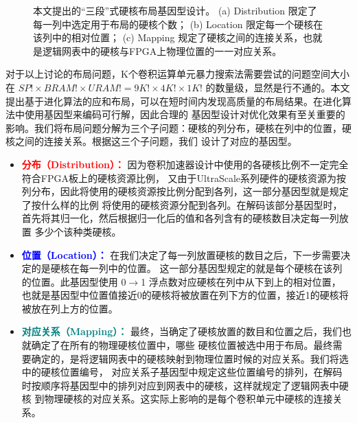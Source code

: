 \begin{figure}[h]

	\caption{
		本文提出的“三段”式硬核布局基因型设计。
		(a) Distribution 限定了每一列中选定用于布局的硬核个数；
		(b) Location 限定每一个硬核在该列中的相对位置；
		(c) Mapping 规定了硬核之间的连接关系，也就是逻辑网表中的硬核与FPGA上物理位置的一一对应关系。
	}
	
	

	\label{fig:genotype}
  \vspace{-0.2in}
\end{figure}

对于以上讨论的布局问题，K个卷积运算单元暴力搜索法需要尝试的问题空间大小在 $SP! \times BRAM! \times URAM! = 9K!\times4K!\times1K!$
的数量级，显然是行不通的。本文提出基于进化算法的应和布局，可以在短时间内发现高质量的布局结果。在进化算法中使用基因型来编码可行解，因此合理的
基因型设计对优化效果有至关重要的影响。我们将布局问题分解为三个子问题：硬核的列分布，硬核在列中的位置，硬核之间的连接关系。根据这三个子问题，我们
设计了对应的基因型。

\begin{itemize}
	\item \textcolor{red}{\bf 分布（Distribution）：} 因为卷积加速器设计中使用的各硬核比例不一定完全符合FPGA板上的硬核资源比例，
		又由于UltraScale系列硬件的硬核资源为按列分布，因此将使用的硬核资源按比例分配到各列，这一部分基因型就是规定了按什么样的比例
		将使用的硬核资源分配到各列。在解码该部分基因型时，首先将其归一化，然后根据归一化后的值和各列含有的硬核数目决定每一列放置
		多少个该种类硬核。
	\item \textcolor{blue}{\bf 位置（Location）：} 在我们决定了每一列放置硬核的数目之后，下一步需要决定的是硬核在每一列中的位置。
		这一部分基因型规定的就是每个硬核在该列的位置。此基因型使用 0$\rightarrow$1 浮点数对应硬核在列中从下到上的相对位置，
		也就是基因型中位置值接近0的硬核将被放置在列下方的位置，接近1的硬核将被放在列上方的位置。
	\item \textcolor{teal}{\bf 对应关系（Mapping）：} 最终，当确定了硬核放置的数目和位置之后，我们也就确定了在所有的物理硬核位置中，哪些
		硬核位置被选中用于布局。最终需要确定的，是将逻辑网表中的硬核映射到物理位置时候的对应关系。我们将选中的硬核位置编号，
		对应关系子基因型中规定这些位置编号的排列，在解码时按顺序将基因型中的排列对应到网表中的硬核，这样就规定了逻辑网表中硬核
		到物理硬核的对应关系。这实际上影响的是每个卷积单元中硬核的连接关系。
\end{itemize}

